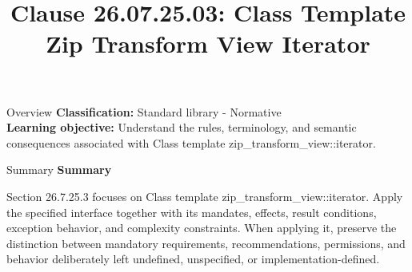 \documentclass[10pt,letterpaper]{article}
\title{Clause 26.07.25.03: Class Template Zip Transform View Iterator}
\author{}
\date{}
\begin{document}
\maketitle
\begin{CornellOverviewBox}{Overview}
\textbf{Classification:} Standard library - Normative\\[2pt]
\textbf{Learning objective:} Understand the rules, terminology, and semantic consequences associated with Class template zip\_transform\_view::iterator.
\end{CornellOverviewBox}\begin{CornellSummaryBox}{Summary}
{\sffamily\bfseries\color{Accent} Summary}\par\vspace{3pt}Section 26.7.25.3 focuses on Class template zip\_transform\_view::iterator. Apply the specified interface together with its mandates, effects, result conditions, exception behavior, and complexity constraints. When applying it, preserve the distinction between mandatory requirements, recommendations, permissions, and behavior deliberately left undefined, unspecified, or implementation-defined.
\end{CornellSummaryBox}
\end{document}
